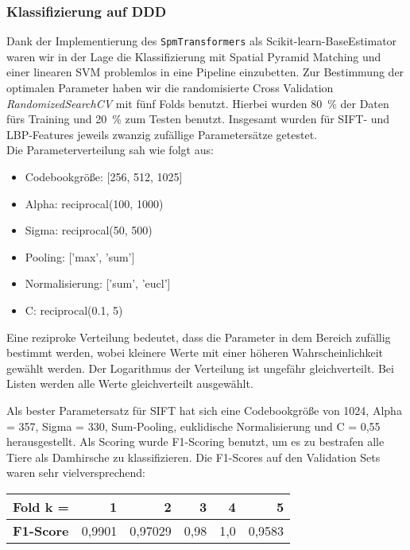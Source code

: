 \subsubsection{Klassifizierung auf DDD}

Dank der Implementierung des \texttt{SpmTransformers} als Scikit-learn-BaseEstimator waren wir in der Lage die Klassifizierung mit Spatial Pyramid Matching und einer linearen SVM problemlos in eine Pipeline einzubetten. Zur Bestimmung der optimalen Parameter haben wir die randomisierte Cross Validation \emph{RandomizedSearchCV} mit fünf Folds benutzt. Hierbei wurden 80~\% der Daten fürs Training und 20~\% zum Testen benutzt. Insgesamt wurden für SIFT- und LBP-Features jeweils zwanzig zufällige Parametersätze getestet.\\
Die Parameterverteilung sah wie folgt aus:
\begin{itemize}
	\item Codebookgröße: [256, 512, 1025]
	\item Alpha: reciprocal(100, 1000)
	\item Sigma: reciprocal(50, 500)
	\item Pooling: ['max', 'sum']
	\item Normalisierung: ['sum', 'eucl']
	\item C: reciprocal(0.1, 5)
\end{itemize} 

Eine reziproke Verteilung bedeutet, dass die Parameter in dem Bereich zufällig bestimmt werden, wobei kleinere Werte mit einer höheren Wahrscheinlichkeit gewählt werden. Der Logarithmus der Verteilung ist ungefähr gleichverteilt. Bei Listen werden alle Werte gleichverteilt ausgewählt.

Als bester Parametersatz für SIFT hat sich eine Codebookgröße von 1024, Alpha = 357, Sigma = 330, Sum-Pooling, euklidische Normalisierung und C = 0,55 herausgestellt. Als Scoring wurde F1-Scoring benutzt, um es zu bestrafen alle Tiere als Damhirsche zu klassifizieren. Die F1-Scores auf den Validation Sets waren sehr vielversprechend:

\begin{center}
\begin{tabular}{|l|r|r|r|r|r|}
	\hline
	\textbf{Fold k = } & 1 & 2 & 3 & 4 & 5 \\ \hline
	\textbf{F1-Score} & 0,9901 & 0,97029 & 0,98 & 1,0 & 0,9583 \\ \hline
\end{tabular}
\end{center}

